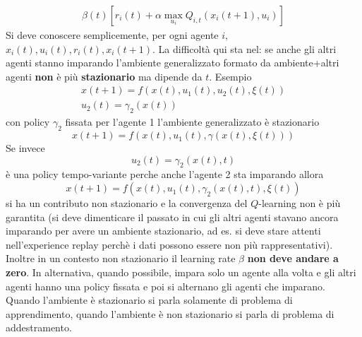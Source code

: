 \begin{itemize}
\begin{align}
    \beta(t) [r_i(t) + \alpha \max_{u_i} Q_{i,t}(x_i(t+1), u_i)]
    \end{align} Si deve conoscere semplicemente, per ogni agente $i$, $x_i(t), u_i(t), r_i(t), x_i(t+1)$.
    La difficolt\`a qui sta nel: se anche gli altri agenti stanno imparando l'ambiente generalizzato formato da ambiente+altri agenti \textbf{non} \`e pi\`u \textbf{stazionario} ma dipende da $t$.
    Esempio
    \begin{align}
    x(t+1) = f(x(t), u_1(t), u_2(t), \xi(t)) \\
    u_2(t) = \gamma_2(x(t))
    \end{align} con policy $\gamma_2$ fissata per l'agente 1 l'ambiente generalizzato \`e stazionario
    \begin{equation}
    x(t+1) = f(x(t), u_1(t), \gamma(x(t), \xi(t)))
    \end{equation} Se invece 
    \begin{equation}
    u_2(t) = \gamma_2(x(t),t)
    \end{equation} \`e una policy tempo-variante perche anche l'agente 2 sta imparando allora
    \begin{equation}
    x(t+1) = f(x(t), u_1(t), \gamma_2(x(t),t), \xi(t))
    \end{equation} si ha un contributo non stazionario e la convergenza del $Q$-learning non \`e pi\`u garantita (si deve dimenticare il passato in cui gli altri agenti stavano ancora imparando per avere un ambiente stazionario, ad es. si deve stare attenti nell'experience replay perch\`e i dati possono essere non pi\`u rappresentativi). Inoltre in un contesto non stazionario il learning rate $\beta$ \textbf{non deve andare a zero}. 
    In alternativa, quando possibile, impara solo un agente alla volta e gli altri agenti hanno una policy fissata e poi si alternano gli agenti che imparano.
    Quando l'ambiente \`e stazionario si parla solamente di problema di apprendimento, quando l'ambiente \`e non stazionario si parla di problema di addestramento.
\end{itemize}